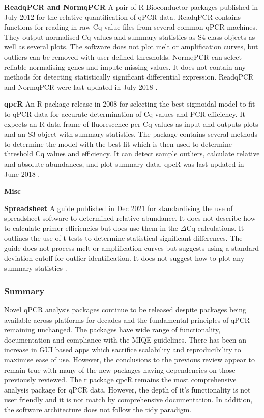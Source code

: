 \documentclass[../main.tex]{subfiles}
\begin{document}
\textbf{ReadqPCR and NormqPCR} A pair of R Bioconductor packages published in July 2012 for the relative quantification of qPCR data. 
ReadqPCR contains functions for reading in raw Cq value files from several common qPCR machines. 
They output normalised Cq values and summary statistics as S4 class objects as well as several plots. 
The software does not plot melt or amplification curves, but outliers can be removed with user defined thresholds. 
NormqPCR can select reliable normalising genes and impute missing values. 
It does not contain any methods for detecting statistically significant differential expression. 
ReadqPCR and NormqPCR were last updated in July 2018 \parencite{Perkins2012}.

\textbf{qpcR} An R package release in 2008 for selecting the best sigmoidal model to fit to qPCR data for accurate determination of Cq values and PCR efficiency. 
It expects an R data frame of fluorescence per Cq values as input and outputs plots and an S3 object with summary statistics. 
The package contains several methods to determine the model with the best fit which is then used to determine threshold Cq values and efficiency. 
It can detect sample outliers, calculate relative and absolute abundances, and plot summary data. qpcR was last updated in June 2018 \parencite{Ritz2008}.

\textbf{Misc}

\textbf{Spreadsheet} A guide published in Dec 2021 for standardising the use of spreadsheet software to determined relative abundance. 
It does not describe how to calculate primer efficiencies but does use them in the $\Delta$Cq calculations. 
It outlines the use of t-tests to determine statistical significant differences.  
The guide does not process melt or amplification curves but suggests using a standard deviation cutoff for outlier identification. 
It does not suggest how to plot any summary statistics \parencite{Ng2021}.

\subsubsection{Summary}
Novel qPCR analysis packages continue to be released despite packages being available across platforms for decades and the fundamental principles of qPCR remaining unchanged. 
The packages have wide range of functionality, documentation and compliance with the MIQE guidelines. 
There has been an increase in GUI based apps which sacrifice scalability and reproducibility to maximise ease of use. 
However, the conclusions to the previous review appear to remain true with many of the new packages having dependencies on those previously reviewed. 
The r package qpcR remains the most comprehensive analysis package for qPCR data. 
However, the depth of it's functionality is not user friendly and it is not match by comprehensive documentation. 
In addition, the software architecture does not follow the tidy paradigm.
\end{document}
